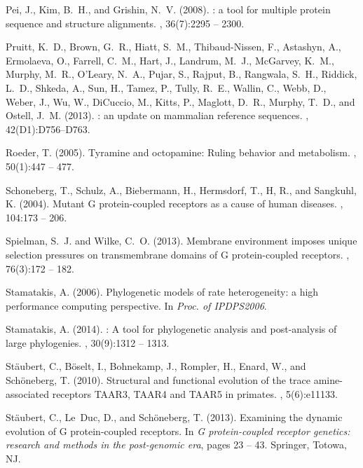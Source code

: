 \documentclass[fleqn,10pt]{wlpeerj}
\begin{document}
\begin{thebibliography}{}
Pei, J., Kim, B.~H., and Grishin, N.~V. (2008).
: a tool for multiple protein sequence and structure
  alignments.
, 36(7):2295 -- 2300.

Pruitt, K.~D., Brown, G.~R., Hiatt, S.~M., Thibaud-Nissen, F., Astashyn, A.,
  Ermolaeva, O., Farrell, C.~M., Hart, J., Landrum, M.~J., McGarvey, K.~M.,
  Murphy, M.~R., O'Leary, N.~A., Pujar, S., Rajput, B., Rangwala, S.~H.,
  Riddick, L.~D., Shkeda, A., Sun, H., Tamez, P., Tully, R.~E., Wallin, C.,
  Webb, D., Weber, J., Wu, W., DiCuccio, M., Kitts, P., Maglott, D.~R., Murphy,
  T.~D., and Ostell, J.~M. (2013).
: an update on mammalian reference sequences.
, 42(D1):D756--D763.

Roeder, T. (2005).
\newblock Tyramine and octopamine: Ruling behavior and metabolism.
, 50(1):447 -- 477.

Schoneberg, T., Schulz, A., Biebermann, H., Hermsdorf, T., H, R., and Sangkuhl,
  K. (2004).
\newblock Mutant {G} protein-coupled receptors as a cause of human diseases.
, 104:173 -- 206.

Spielman, S.~J. and Wilke, C.~O. (2013).
\newblock Membrane environment imposes unique selection pressures on
  transmembrane domains of {G} protein-coupled receptors.
, 76(3):172 -- 182.

Stamatakis, A. (2006).
\newblock Phylogenetic models of rate heterogeneity: a high performance
  computing perspective.
\newblock In {\em Proc. of IPDPS2006}.

Stamatakis, A. (2014).
: A tool for phylogenetic analysis and post-analysis
  of large phylogenies.
, 30(9):1312 -- 1313.

St{\"a}ubert, C., B{\"o}selt, I., Bohnekamp, J., Rompler, H., Enard, W., and
  Sch{\"o}neberg, T. (2010).
\newblock Structural and functional evolution of the trace amine-associated
  receptors {TAAR3, TAAR4} and {TAAR5} in primates.
, 5(6):e11133.

St{\"a}ubert, C., Le~Duc, D., and Sch{\"o}neberg, T. (2013).
\newblock Examining the dynamic evolution of {G} protein-coupled receptors.
\newblock In {\em {G} protein-coupled receptor genetics: research and methods
  in the post-genomic era}, pages 23 -- 43. Springer, Totowa, NJ.


\end{thebibliography}
\end{document}
